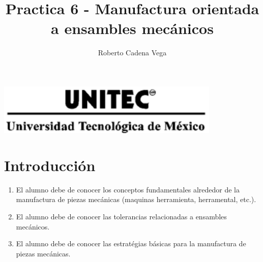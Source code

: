 



\title{ Practica 6 - Manufactura orientada a ensambles mecánicos }

\author{Roberto Cadena Vega} %

\date{ } %




\maketitle %
\begin{marginfigure}
	\includegraphics[width=0.8\textwidth]{../../images/UNITEC.png}
\end{marginfigure}


\section{Introducción}

	\begin{enumerate}
		\item El alumno debe de conocer los conceptos fundamentales alrededor de la manufactura de piezas mecánicas (maquinas herramienta, herramental, etc.).
		\item El alumno debe de conocer las tolerancias relacionadas a ensambles mecánicos.
		\item El alumno debe de conocer las estratégias básicas para la manufactura de piezas mecánicas.
	\end{enumerate}

